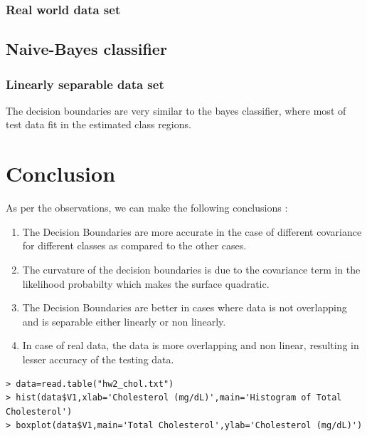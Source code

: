 \documentclass[a4paper]{article}
\begin{document}
	
		\subsubsection{Real world data set}
			
	
	\subsection{Naive-Bayes classifier}
	\subsubsection{Linearly separable data set}
		The decision boundaries are very similar to the bayes classifier, where most
		of test data fit in the estimated class regions.
		
		
		
\section{Conclusion}
	As per the observations, we can make the following conclusions :
	
	\begin{enumerate}
	  \item The Decision Boundaries are more accurate in the case of different
	  covariance for different classes as compared to the other cases.
	  \item The curvature of the decision boundaries is due to the covariance term
	  in the likelihood probabilty which makes the surface quadratic.
	  \item The Decision Boundaries are better in cases where data is not
	  overlapping and is separable either linearly or non linearly.
	  \item In case of real data, the data is more overlapping and non
	  linear, resulting in lesser accuracy of the testing data.
	\end{enumerate}

\begin{verbatim}
> data=read.table("hw2_chol.txt")
> hist(data$V1,xlab='Cholesterol (mg/dL)',main='Histogram of Total Cholesterol')
> boxplot(data$V1,main='Total Cholesterol',ylab='Cholesterol (mg/dL)')
\end{verbatim}
\end{document}
